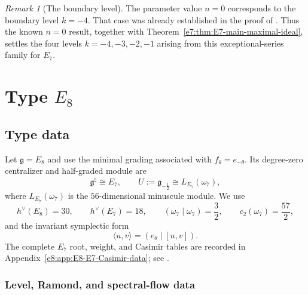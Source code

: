 \documentclass[11pt,reqno]{amsart}
\theoremstyle{definition}
\theoremstyle{remark}
\newtheorem{remark}[theorem]{Remark}
\begin{document}
\begin{remark}[The boundary level]

The parameter value \(n=0\) corresponds to the boundary level \(k=-4\).
That case was already established in the proof of
\cite[Theorem~3.1]{ArakawaMoreau2018}.  Thus the known \(n=0\) result,
together with Theorem~\ref{e7:thm:E7-main-maximal-ideal}, settles the four
levels \(k=-4,-3,-2,-1\) arising from this exceptional-series family for
\(E_7\).
\end{remark}
\section{Type \texorpdfstring{$E_8$}{E8}}
\label{sec:case-e8}


\subsection{Type data}
\label{e8:sec:preliminaries}

Let $\mathfrak g=E_8$ and use the minimal grading associated with
$f_\theta=e_{-\theta}$.  Its degree-zero centralizer and half-graded module
are
\begin{equation*}
 \mathfrak g^\natural\cong E_7,
 \qquad
 U:=\mathfrak g_{-\frac12}\cong L_{E_7}(\omega_7),
\end{equation*}
where $L_{E_7}(\omega_7)$ is the $56$-dimensional minuscule module.  We use
\begin{equation*}
 h^\vee(E_8)=30,
 \qquad h^\vee(E_7)=18,
 \qquad
 (\omega_7\mid\omega_7)=\frac32,
 \qquad c_2(\omega_7)=\frac{57}{2},
\end{equation*}
and the invariant symplectic form
\begin{equation}
 \langle u,v\rangle=(e_\theta\mid[u,v]).
 \label{e8:eq:E8-half-piece-symplectic-form}
\end{equation}
The complete $E_7$ root, weight, and Casimir tables are recorded in
Appendix~\ref{e8:app:E8-E7-Casimir-data}; see
\cite{KacWakimoto2004,AdamovicKacMosenederFrajriaPapiPerse2018}.


\subsubsection{Level, Ramond, and spectral-flow data}
\end{document}
